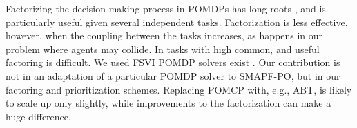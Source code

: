 \documentclass[letterpaper]{article} %
\begin{document}
Factorizing the decision-making process in POMDPs has long roots \cite[e.g.]{shani2008efficient,veiga2014point}, and is particularly useful given several independent tasks.
Factorization is less effective, however, when the coupling between the tasks increases, as happens in our problem where agents may collide. In tasks with high  common, and useful factoring is difficult.
We used FSVI  POMDP solvers exist \cite[e.g.]{walraven2019point,kurniawati2016online,ye2017despot}. Our contribution  is not in an adaptation of a particular POMDP solver to SMAPF-PO, but in our factoring and prioritization schemes. Replacing POMCP with, e.g., ABT, is likely to scale up only slightly, while improvements to the factorization can make a huge difference.



\end{document}
